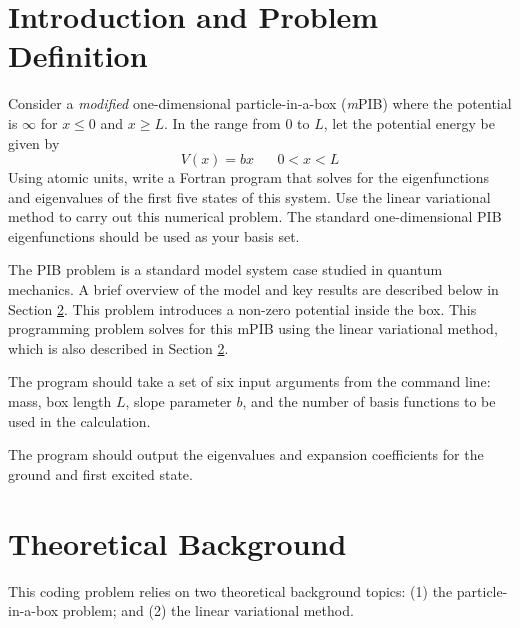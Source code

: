 \setdate{\today}
\setcounter{chapter}{1}
%

\makeheaderfooter{}
\maketitle
%
%
\section{Introduction and Problem Definition}
Consider a \emph{modified} one-dimensional particle-in-a-box (\emph{m}PIB) where the potential is $\infty$ for $x\le{}0$ and $x\ge{}L$. In the range from $0$ to $L$, let the potential energy be given by
%
\begin{equation}\label{Eq:mPIBPotential}
\displaystyle
  V\left(x\right) = b x\,\,\,\,\,\,\,\,\,\,0<x<L
\end{equation}
%
Using atomic units, write a Fortran program that solves for the eigenfunctions and eigenvalues of the first five states of this system. Use the linear variational method to carry out this numerical problem. The standard one-dimensional PIB eigenfunctions should be used as your basis set.

The PIB problem is a standard model system case studied in quantum mechanics. A brief overview of the model and key results are described below in Section \ref{Section:TheoreticalBackground}. This problem introduces a non-zero potential inside the box. This programming problem solves for this mPIB using the linear variational method, which is also described in Section \ref{Section:TheoreticalBackground}.

The program should take a set of six input arguments from the command line: mass, box length $L$, slope parameter $b$, and the number of basis functions to be used in the calculation.

The program should output the eigenvalues and expansion coefficients for the ground and first excited state.

%
\section{Theoretical Background}\label{Section:TheoreticalBackground}
This coding problem relies on two theoretical background topics: (1) the particle-in-a-box problem; and (2) the linear variational method.

